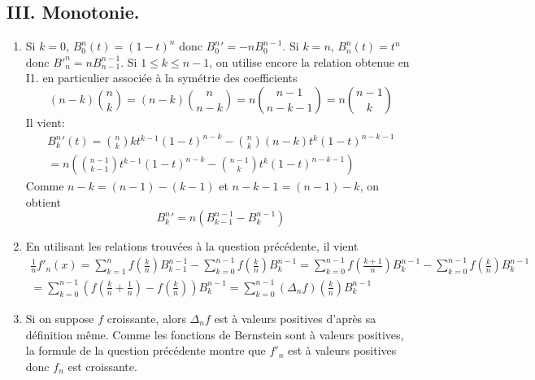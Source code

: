 \subsection*{III. Monotonie.}
\begin{enumerate}
 \item Si $k=0$, $B^n_0(t)= (1-t)^n$ donc ${B^n_0}'=-nB^{n-1}_0$.\newline
Si $k=n$, $B^n_n(t)= t^n$ donc $B'^n_n=nB^{n-1}_{n-1}$.\newline
Si $1\leq k \leq n-1$, on utilise encore la relation obtenue en I1. en particulier associée à la symétrie des coefficients
\begin{displaymath}
 (n-k)\binom{n}{k} = (n-k)\binom{n}{n-k} = n \binom{n-1}{n-k-1} = n \binom{n-1}{k}  
\end{displaymath}
Il vient:
\begin{multline*}
 {B^n_k}'(t)= \binom{n}{k}kt^{k-1}(1-t)^{n-k}-\binom{n}{k}(n-k)t^{k}(1-t)^{n-k-1}\\
= n\left( \binom{n-1}{k-1}t^{k-1}(1-t)^{n-k} - \binom{n-1}{k}t^{k}(1-t)^{n-k-1}\right) 
\end{multline*}
Comme $n-k = (n-1)-(k-1)$ et $n-k-1 = (n-1)-k$, on obtient
\begin{displaymath}
 {B^n_k}'= n \left(B^{n-1}_{k-1}-B^{n-1}_{k} \right) 
\end{displaymath}

 \item En utilisant les relations trouvées à la question précédente, il vient
\begin{multline*}
 \frac{1}{n}f'_n(x)=
 \sum_{k=1}^nf(\frac{k}{n}) B^{n-1}_{k-1}
-\sum_{k=0}^{n-1}f(\frac{k}{n}) B^{n-1}_{k}
= \sum_{k=0}^{n-1}f(\frac{k+1}{n}) B^{n-1}_{k}
-\sum_{k=0}^{n-1}f(\frac{k}{n}) B^{n-1}_{k}\\
= \sum_{k=0}^{n-1}\left(f(\frac{k}{n}+\frac{1}{n})-f(\frac{k}{n}) \right)B^{n-1}_{k}
=  \sum_{k=0}^{n-1}(\Delta_n f)(\frac{k}{n}) B^{n-1}_{k}
\end{multline*}


 \item Si on suppose $f$ croissante, alors $\Delta_n f$ est à valeurs positives d'après sa définition même. Comme les fonctions de Bernstein sont à valeurs positives, la formule de la question précédente montre que $f'_n$ est à valeurs positives donc $f_n$ est croissante.
\end{enumerate}

